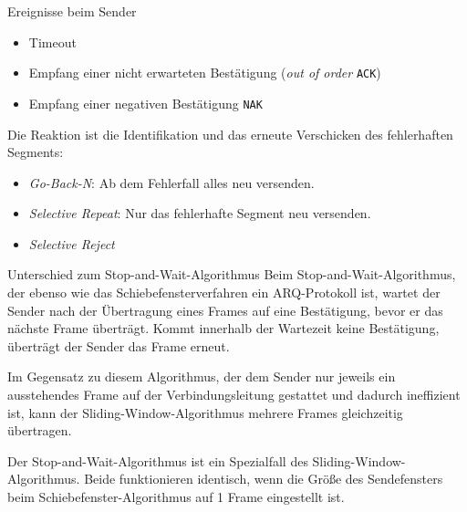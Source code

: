 \begin{defi}{Ereignisse beim Sender}
    \begin{itemize}
        \item Timeout
        \item Empfang einer nicht erwarteten Bestätigung (\emph{out of order} \texttt{ACK})
        \item Empfang einer negativen Bestätigung \texttt{NAK}
    \end{itemize}

    Die Reaktion ist die Identifikation und das erneute Verschicken des fehlerhaften Segments:
    \begin{itemize}
        \item \emph{Go-Back-N}: Ab dem Fehlerfall alles neu versenden.
        \item \emph{Selective Repeat}: Nur das fehlerhafte Segment neu versenden.
        \item \emph{Selective Reject}
    \end{itemize}
\end{defi}

\begin{bonus}{Unterschied zum Stop-and-Wait-Algorithmus}
    Beim Stop-and-Wait-Algorithmus, der ebenso wie das Schiebefensterverfahren ein ARQ-Protokoll ist, wartet der Sender nach der Übertragung eines Frames auf eine Bestätigung, bevor er das nächste Frame überträgt.
    Kommt innerhalb der Wartezeit keine Bestätigung, überträgt der Sender das Frame erneut.

    Im Gegensatz zu diesem Algorithmus, der dem Sender nur jeweils ein ausstehendes Frame auf der Verbindungsleitung gestattet und dadurch ineffizient ist, kann der Sliding-Window-Algorithmus mehrere Frames gleichzeitig übertragen.

    Der Stop-and-Wait-Algorithmus ist ein Spezialfall des Sliding-Window-Algorithmus.
    Beide funktionieren identisch, wenn die Größe des Sendefensters beim Schiebefenster-Algorithmus auf 1 Frame eingestellt ist.
\end{bonus}